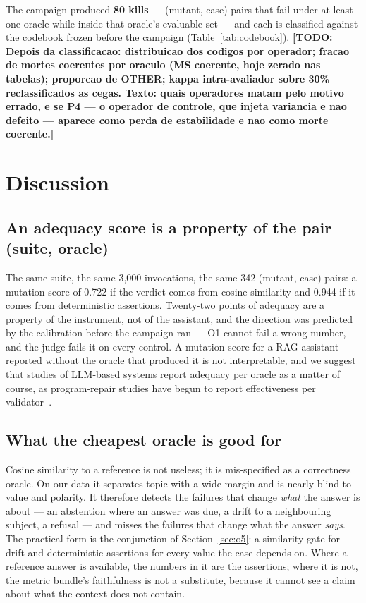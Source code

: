 \documentclass[a4paper,fleqn]{cas-dc}
\newcommand{\todo}[1]{{\color{red}\bfseries [TODO: #1]}}
\begin{document}
The campaign produced \textbf{80 kills} --- (mutant, case) pairs that fail
under at least one oracle while inside that oracle's evaluable set --- and each
is classified against the codebook frozen before the campaign
(Table~\ref{tab:codebook}).
\todo{Depois da classificacao: distribuicao dos codigos por operador; fracao
de mortes coerentes por oraculo (MS coerente, hoje zerado nas tabelas);
proporcao de OTHER; kappa intra-avaliador sobre 30\% reclassificados as cegas.
Texto: quais operadores matam pelo motivo errado, e se P4 --- o operador de
controle, que injeta variancia e nao defeito --- aparece como perda de
estabilidade e nao como morte coerente.}

\section{Discussion}
\label{sec:discussion}

\subsection{An adequacy score is a property of the pair (suite, oracle)}

The same suite, the same 3,000 invocations, the same 342 (mutant, case) pairs:
a mutation score of 0.722 if the verdict comes from cosine similarity and 0.944
if it comes from deterministic assertions. Twenty-two points of adequacy are a
property of the instrument, not of the assistant, and the direction was
predicted by the calibration before the campaign ran --- O1 cannot fail a wrong
number, and the judge fails it on every control. A mutation score
for a RAG assistant reported without the oracle that produced it is not
interpretable, and we suggest that studies of LLM-based systems report
adequacy per oracle as a matter of course, as program-repair studies have begun
to report effectiveness per validator~\cite{bonfim2026evaluator}.

\subsection{What the cheapest oracle is good for}

Cosine similarity to a reference is not useless; it is mis-specified as a
correctness oracle. On our data it separates topic with a wide margin and is
nearly blind to value and polarity. It therefore detects the failures that
change \emph{what} the answer is about --- an abstention where an answer was
due, a drift to a neighbouring subject, a refusal --- and misses the failures
that change what the answer \emph{says}. The practical form is the conjunction
of Section~\ref{sec:o5}: a similarity gate for drift and deterministic
assertions for every value the case depends on. Where a reference answer is
available, the numbers in it are the assertions; where it is not, the metric
bundle's faithfulness is not a substitute, because it cannot see a claim about
what the context does not contain.
\end{document}
